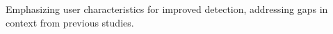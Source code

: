 Emphasizing user characteristics for improved detection, addressing gaps in context from previous studies.